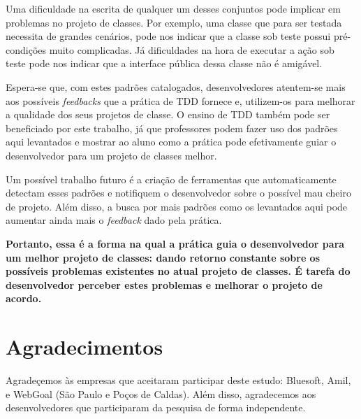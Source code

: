 \documentclass[conference]{IEEEtran}
\begin{document}
Uma dificuldade na escrita de qualquer um desses conjuntos pode implicar
em problemas no projeto de classes. Por exemplo, uma classe que para
ser testada necessita de grandes cenários, pode nos indicar que a classe
sob teste possui pré-condições muito complicadas. Já dificuldades na hora
de executar a ação sob teste pode nos indicar que a interface pública dessa
classe não é amigável. 

Espera-se que, com estes padrões catalogados, desenvolvedores atentem-se mais
aos possíveis \textit{feedbacks} que a prática de TDD fornece e, utilizem-os
para melhorar a qualidade dos seus projetos de classe. O ensino de TDD também
pode ser beneficiado por este trabalho, já que professores podem fazer uso dos padrões
aqui levantados e mostrar ao aluno como a prática pode efetivamente guiar
o desenvolvedor para um projeto de classes melhor.

Um possível trabalho futuro
é a criação de ferramentas que automaticamente detectam esses padrões e notifiquem
o desenvolvedor sobre o possível mau cheiro de projeto. 
Além disso, a busca por mais padrões como os levantados aqui pode aumentar ainda 
mais o \textit{feedback} dado pela prática. 

\textbf{Portanto, essa é a forma na qual a prática guia o desenvolvedor para
um melhor projeto de classes: dando retorno constante sobre os possíveis problemas
existentes no atual projeto de classes. É tarefa do desenvolvedor perceber
estes problemas e melhorar o projeto de acordo.}

\section*{Agradecimentos}

Agradeçemos às empresas que aceitaram participar deste estudo: Bluesoft,
Amil, e WebGoal (São Paulo e Poços de Caldas). Além disso, agradecemos aos
desenvolvedores que participaram da pesquisa de forma independente.


\footnotesize{}

\end{document}
